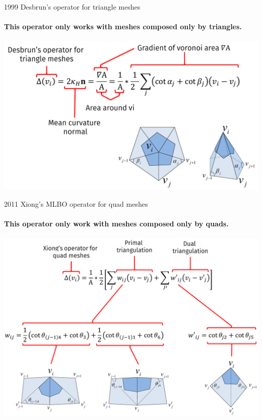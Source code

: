 \documentclass[10pt, compress, english]{beamer}
\begin{document}
\begin{frame}{1999 Desbrun's operator for triangle meshes}


\framesubtitle{This operator only works with meshes composed only by \textbf{triangles}.}


\begin{center}
\includegraphics[width=0.9\columnwidth]{img/proposal_desbrun}
\par\end{center}

\end{frame}

\begin{frame}{2011 Xiong's MLBO operator for quad meshes}


\framesubtitle{This operator only work with meshes composed only by \textbf{quads}.}

\vspace{-10bp}

\begin{center}
\includegraphics[width=1.0\columnwidth]{img/proposal_xiong}
\par\end{center}



\end{frame}
\end{document}
